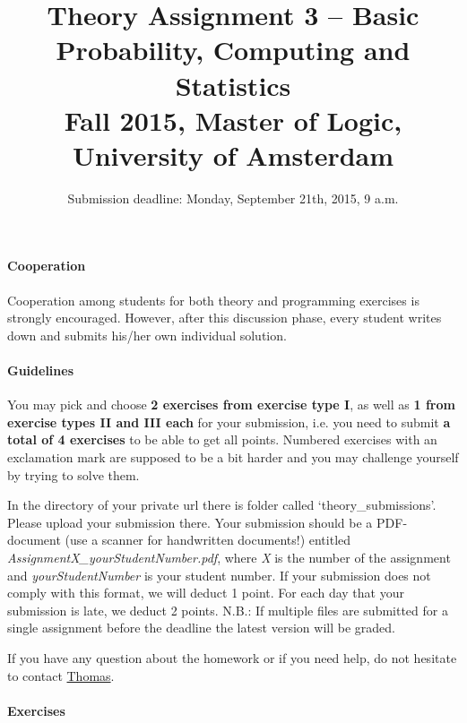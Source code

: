 \documentclass{article}
\title{Theory Assignment 3 -- Basic Probability, Computing and Statistics\\[2mm]
\large{Fall 2015, Master of Logic, University of Amsterdam}}
\author{}
\date{Submission deadline: Monday, September 21th, 2015, 9 a.m.}
\begin{document}
\maketitle

\paragraph{Cooperation}
Cooperation among students for both theory and programming exercises
is strongly encouraged.  However, after this discussion phase, every student writes down and submits his/her own individual solution.

\paragraph{Guidelines}
You may pick and choose {\bf 2 exercises from exercise type I}, as well as {\bf 1 from exercise types II and III each} for your submission, i.e. you need to submit {\bf a total of 4 exercises} to be able to get all points. Numbered exercises with an exclamation mark are supposed to be a bit harder and you may challenge yourself by trying to solve them.

In the directory of your private url there is folder called `theory\_submissions'. Please upload your submission there. Your submission should be a PDF-document (use a scanner for handwritten documents!) entitled \textit{AssignmentX\_yourStudentNumber.pdf}, where \textit{X} is the number of the assignment and \textit{yourStudentNumber} is your student number. If your submission does not comply with this format, we will deduct 1 point. For each day that your submission is late, we deduct 2 points. N.B.: If multiple files are submitted for a single assignment before the deadline the latest version will be graded.

If you have any question about the homework or if you need help, do not hesitate to contact \href{mailto:T.S.Brochhagen@uva.nl}{Thomas}.

\paragraph{Exercises}
\end{document}

